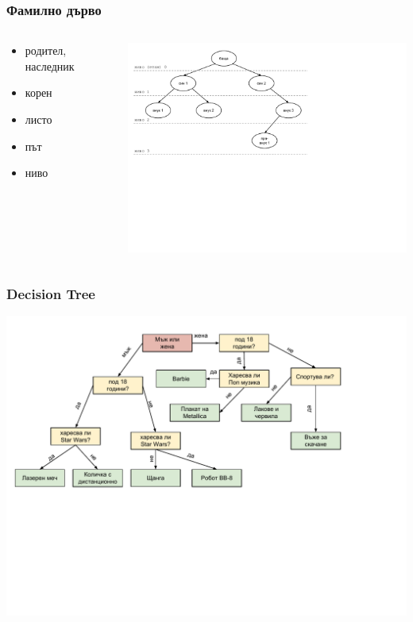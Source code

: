 \documentclass{beamer}
\begin{document}
\begin{frame}[fragile]
\frametitle{Фамилно дърво}

\begin{columns}[t]
  \begin{column}{0.35\textwidth}

    \begin{itemize}
      \item родител, наследник
      \item корен
      \item листо 
      \item път
      \item ниво
    \end{itemize}

  \end{column}
  \begin{column}{0.65\textwidth}

\includegraphics[width=10cm]{images/tree_family_tree}

  \end{column}
\end{columns}

\end{frame}


\begin{frame}[fragile]
\frametitle{Decision Tree}

\includegraphics[width=14cm]{images/tree_decision}

\end{frame}
\end{document}
